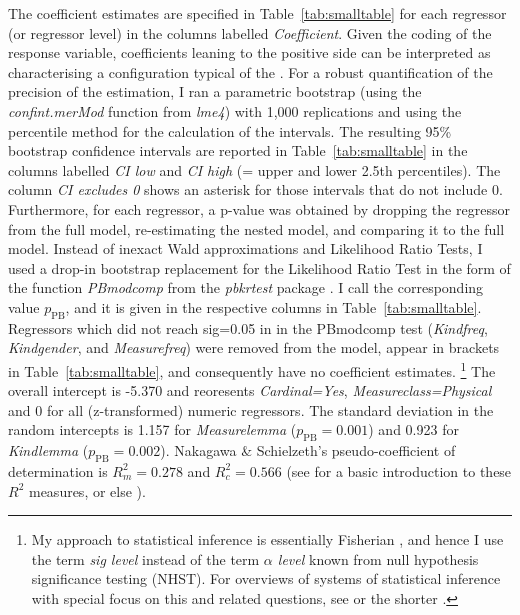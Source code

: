 The coefficient estimates are specified in Table~\ref{tab:smalltable} for each regressor (or regressor level) in the columns labelled \textit{Coefficient}.
Given the coding of the response variable, coefficients leaning to the positive side can be interpreted as characterising a configuration typical of the \PGCd.
For a robust quantification of the precision of the estimation, I ran a parametric bootstrap (using the \mbox{\textit{confint.merMod}} function from \textit{lme4}) with 1,000 replications and using the percentile method for the calculation of the intervals.
The resulting 95\% bootstrap confidence intervals are reported in Table~\ref{tab:smalltable} in the columns labelled \textit{CI low} and \textit{CI high} (= upper and lower 2.5th percentiles).
The column \textit{CI excludes 0} shows an asterisk for those intervals that do not include 0.
Furthermore, for each regressor, a p-value was obtained by dropping the regressor from the full model, re-estimating the nested model, and comparing it to the full model.
Instead of inexact Wald approximations and Likelihood Ratio Tests, I used a drop-in bootstrap replacement for the Likelihood Ratio Test in the form of the function \textit{PBmodcomp} from the \textit{pbkrtest} package \citep{HalekohHojsgaard2014}.
I call the corresponding value $p_{\text{PB}}$, and it is given in the respective columns in Table~\ref{tab:smalltable}.
Regressors which did not reach sig=0.05 in in the PBmodcomp test (\textit{Kindfreq}, \textit{Kindgender}, and \textit{Measurefreq}) were removed from the model, appear in brackets in Table~\ref{tab:smalltable}, and consequently have no coefficient estimates.%
\footnote{My approach to statistical inference is essentially Fisherian \citep{Fisher1935,Fisher1959}, and hence I use the term \textit{sig level} instead of the term \textit{$\alpha$ level} known from null hypothesis significance testing (NHST).
For overviews of systems of statistical inference with special focus on this and related questions, see \citet{Lehmann1993,Lehmann2011} or the shorter \citet{Perezgonzalez2015}.}
The overall intercept is -5.370 and reoresents \textit{Cardinal=Yes}, \textit{Measureclass=Physical} and 0 for all (z-transformed) numeric regressors.
The standard deviation in the random intercepts is 1.157 for \textit{Measurelemma} ($p_{\text{PB}}=0.001$) and 0.923 for \textit{Kindlemma} ($p_{\text{PB}}=0.002$).
Nakagawa \& Schielzeth's pseudo-coefficient of determination is $R_m^2=0.278$ and $R^2_c=0.566$ (see \citealp{Gries2015} for a basic introduction to these $R^2$ measures, or else \citealp{NakagawaSchielzeth2013}).

